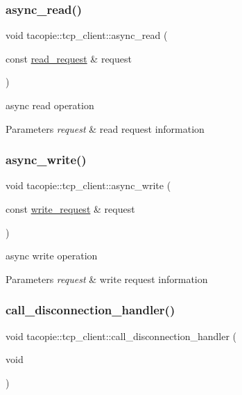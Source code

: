 \subsubsection{\texorpdfstring{async\+\_\+read()}{async\_read()}}
{\footnotesize\ttfamily void tacopie\+::tcp\+\_\+client\+::async\+\_\+read (\begin{DoxyParamCaption}\item[{const \hyperlink{structtacopie_1_1tcp__client_1_1read__request}{read\+\_\+request} \&}]{request }\end{DoxyParamCaption})}

async read operation


\begin{DoxyParams}{Parameters}
{\em request} & read request information \\
\hline
\end{DoxyParams}
\mbox{\label{classtacopie_1_1tcp__client_a2304ed6d4ca0cbc74e6aa72d3e92b76a}} 
\subsubsection{\texorpdfstring{async\+\_\+write()}{async\_write()}}
{\footnotesize\ttfamily void tacopie\+::tcp\+\_\+client\+::async\+\_\+write (\begin{DoxyParamCaption}\item[{const \hyperlink{structtacopie_1_1tcp__client_1_1write__request}{write\+\_\+request} \&}]{request }\end{DoxyParamCaption})}

async write operation


\begin{DoxyParams}{Parameters}
{\em request} & write request information \\
\hline
\end{DoxyParams}
\mbox{\label{classtacopie_1_1tcp__client_ae38ae1f64909dd36592a02fc3c245672}} 
\subsubsection{\texorpdfstring{call\+\_\+disconnection\+\_\+handler()}{call\_disconnection\_handler()}}
{\footnotesize\ttfamily void tacopie\+::tcp\+\_\+client\+::call\+\_\+disconnection\+\_\+handler (\begin{DoxyParamCaption}\item[{void}]{ }\end{DoxyParamCaption})\hspace{0.3cm}{\ttfamily [private]}}

